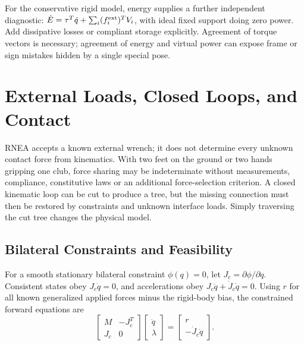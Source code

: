 For the conservative rigid model, energy supplies a further independent diagnostic: $\dot E=\tau^T\dot q+\sum_i(f_i^{\rm ext})^TV_i$, with ideal fixed support doing zero power. Add dissipative losses or compliant storage explicitly. Agreement of torque vectors is necessary; agreement of energy and virtual power can expose frame or sign mistakes hidden by a single special pose.

\section{External Loads, Closed Loops, and Contact}
\label{sec:contact_forces}
\label{sec:contact_constraint_handling}
\label{laymans:contact_hard_box}

RNEA accepts a known external wrench; it does not determine every unknown contact force from kinematics. With two feet on the ground or two hands gripping one club, force sharing may be indeterminate without measurements, compliance, constitutive laws or an additional force-selection criterion. A closed kinematic loop can be cut to produce a tree, but the missing connection must then be restored by constraints and unknown interface loads. Simply traversing the cut tree changes the physical model.

\subsection{Bilateral Constraints and Feasibility}
\label{sec:bilateral_constraints}

For a smooth stationary bilateral constraint $\phi(q)=0$, let $J_c=\partial\phi/\partial q$. Consistent states obey $J_c\dot q=0$, and accelerations obey $J_c\ddot q+\dot J_c\dot q=0$. Using $r$ for all known generalized applied forces minus the rigid-body bias, the constrained forward equations are
\begin{equation}
 \begin{bmatrix}M&-J_c^T\\J_c&0\end{bmatrix}
 \begin{bmatrix}\ddot q\\\lambda\end{bmatrix}
 =\begin{bmatrix}r\\-\dot J_c\dot q\end{bmatrix}.
 \label{eq:rnea_contact_solve}
\end{equation}

